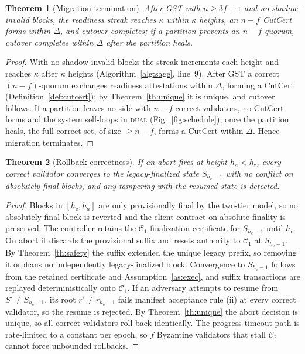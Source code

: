 \documentclass[journal]{IEEEtran}
\newtheorem{theorem}{Theorem}
\begin{document}
\begin{theorem}[Migration termination]
\label{th:termination}
After GST with $n\ge 3f+1$ and no shadow-invalid blocks, the readiness streak reaches $\kappa$
within $\kappa$ heights, an $n-f$ CutCert forms within $\Delta$, and cutover completes; if a
partition prevents an $n-f$ quorum, cutover completes within $\Delta$ after the partition
heals.
\end{theorem}
\begin{proof}
With no shadow-invalid blocks the streak increments each height and reaches $\kappa$ after
$\kappa$ heights (Algorithm~\ref{alg:sage}, line~9). After GST a correct $(n-f)$-quorum exchanges
readiness attestations within $\Delta$, forming a CutCert (Definition~\ref{def:cutcert}); by
Theorem~\ref{th:unique} it is unique, and cutover follows. If a partition leaves no side with
$n-f$ correct validators, no CutCert forms and the system self-loops in \textsc{dual}
(Fig.~\ref{fig:schedule}); once the partition heals, the full correct set, of size $\ge n-f$,
forms a CutCert within $\Delta$. Hence migration terminates.
\end{proof}

\begin{theorem}[Rollback correctness]
\label{th:rollback}
If an abort fires at height $h_a<h_{\mathrm{r}}$, every correct validator converges to the
legacy-finalized state $S_{h_{\mathrm{c}}-1}$ with no conflict on absolutely final blocks, and
any tampering with the resumed state is detected.
\end{theorem}
\begin{proof}
Blocks in $[h_{\mathrm{c}},h_a]$ are only provisionally final by the two-tier model, so no
absolutely final block is reverted and the client contract on absolute finality is preserved.
The controller retains the $\mathcal{C}_1$ finalization certificate for $S_{h_{\mathrm{c}}-1}$
until $h_{\mathrm{r}}$. On abort it discards the provisional suffix and resets authority to
$\mathcal{C}_1$ at $S_{h_{\mathrm{c}}-1}$. By Theorem~\ref{th:safety} the suffix extended the
unique legacy prefix, so removing it orphans no independently legacy-finalized block.
Convergence to $S_{h_{\mathrm{c}}-1}$ follows from the retained certificate and
Assumption~\ref{as:exec}, and suffix transactions are replayed deterministically onto
$\mathcal{C}_1$. If an adversary attempts to resume from $S'\ne S_{h_{\mathrm{c}}-1}$, its root
$r'\ne r_{h_{\mathrm{c}}-1}$ fails manifest acceptance rule (ii) at every correct validator, so
the resume is rejected. By Theorem~\ref{th:unique} the abort decision is unique, so all correct
validators roll back identically. The progress-timeout path is rate-limited to a constant per
epoch, so $f$ Byzantine validators that stall $\mathcal{C}_2$ cannot force unbounded rollbacks.
\end{proof}
\end{document}
